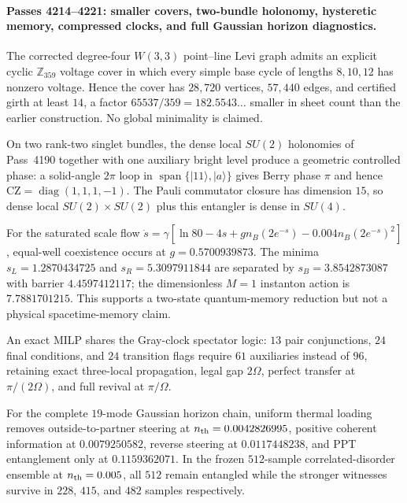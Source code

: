 \providecommand{\rank}{\operatorname{rank}}
\paragraph{Passes 4214--4221: smaller covers, two-bundle holonomy, hysteretic memory, compressed clocks, and full Gaussian horizon diagnostics.}
The corrected degree-four $W(3,3)$ point--line Levi graph admits an explicit cyclic $\mathbb Z_{359}$ voltage cover in which every simple base cycle of lengths $8,10,12$ has nonzero voltage. Hence the cover has $28{,}720$ vertices, $57{,}440$ edges, and certified girth at least $14$, a factor $65537/359=182.5543\ldots$ smaller in sheet count than the earlier construction. No global minimality is claimed.

On two rank-two singlet bundles, the dense local $SU(2)$ holonomies of Pass~4190 together with one auxiliary bright level produce a geometric controlled phase: a solid-angle $2\pi$ loop in $\operatorname{span}\{|11\rangle,|a\rangle\}$ gives Berry phase $\pi$ and hence $\mathrm{CZ}=\operatorname{diag}(1,1,1,-1)$. The Pauli commutator closure has dimension $15$, so dense local $SU(2)\times SU(2)$ plus this entangler is dense in $SU(4)$.

For the saturated scale flow $\dot s=\gamma[\ln80-4s+g n_B(2e^{-s})-0.004n_B(2e^{-s})^2]$, equal-well coexistence occurs at $g=0.5700939873$. The minima $s_L=1.2870434725$ and $s_R=5.3097911844$ are separated by $s_B=3.8542873087$ with barrier $4.4597412117$; the dimensionless $M=1$ instanton action is $7.7881701215$. This supports a two-state quantum-memory reduction but not a physical spacetime-memory claim.

An exact MILP shares the Gray-clock spectator logic: $13$ pair conjunctions, $24$ final conditions, and $24$ transition flags require $61$ auxiliaries instead of $96$, retaining exact three-local propagation, legal gap $2\Omega$, perfect transfer at $\pi/(2\Omega)$, and full revival at $\pi/\Omega$.

For the complete $19$-mode Gaussian horizon chain, uniform thermal loading removes outside-to-partner steering at $n_{\rm th}=0.0042826995$, positive coherent information at $0.0079250582$, reverse steering at $0.0117448238$, and PPT entanglement only at $0.1159362071$. In the frozen $512$-sample correlated-disorder ensemble at $n_{\rm th}=0.005$, all $512$ remain entangled while the stronger witnesses survive in $228$, $415$, and $482$ samples respectively.

